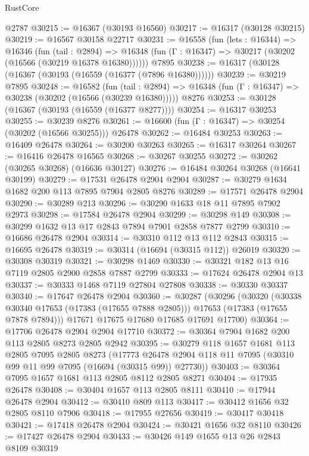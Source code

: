 \begin{lexlean}{RustCore}
\begin{coremodule}
    @2787
@30215 := @16367 (@30193 @16560)
@30217 := @16317 (@30128 @30215)
@30219 := @16567 @30158 @22717
@30231 := @16558
    (fun (lets : @16344) =>
    @16346
      (fun (tail : @2894) =>
      @16348 (fun (Γ : @16347) => @30217 (@30202 (@16566 (@30219 @16378 @16380))))))
    @7895
@30238 := @16317 (@30128 (@16367 (@30193 (@16559 (@16377 (@7896 @16380))))))
@30239 := @30219 @7895
@30248 := @16582
    (fun (tail : @2894) => @16348 (fun (Γ : @16347) => @30238 (@30202 (@16566 (@30239 @16380)))))
    @8276
@30253 := @30128 (@16367 (@30193 (@16559 (@16377 @8277))))
@30254 := @16317 @30253
@30255 := @30239 @8276
@30261 := @16600 (fun (Γ : @16347) => @30254 (@30202 (@16566 @30255))) @26478
@30262 := @16484 @30253
@30263 := @16409 @26478
@30264 := @30200 @30263
@30265 := @16317 @30264
@30267 := @16416 @26478 @16565
@30268 := @30267 @30255
@30272 := @30262 (@30265 @30268) (@16636 @30127)
@30276 := @16484 @30264 @30268 (@16641 @30199)
@30279 := @17531 @26478 @2904 @2904
@30287 := @30279 @1634 @1682 @200 @113 @7895 @7904 @2805 @8276
@30289 := @17571 @26478 @2904
@30290 := @30289 @213
@30296 := @30290 @1633 @18 @11 @7895 @7902 @2973
@30298 := @17584 @26478 @2904
@30299 := @30298 @149
@30308 := @30299 @1632 @13 @17 @2843 @7894 @7901 @2858 @7877 @2799
@30310 := @16686 @26478 @2904
@30314 := @30310 @112 @13 @112 @2843
@30315 := @16695 @26478
@30319 := @30314 (@16694 (@30315 @112)) @26019
@30320 := @30308 @30319
@30321 := @30298 @1469
@30330 := @30321 @182 @13 @16 @7119 @2805 @2900 @2858 @7887 @2799
@30333 := @17624 @26478 @2904 @13
@30337 := @30333 @1468 @7119 @27804 @27808
@30338 := @30330 @30337
@30340 := @17647 @26478 @2904
@30360 := @30287
    (@30296
      (@30320
        (@30338 @30340 @17653 (@17383 (@17655 @7888 @2805)))
        @17653
        (@17383 (@17655 @7878 @7894)))
      @17671
      @17675
      @17680
      @17685
      @17691
      @17700)
@30364 := @17706 @26478 @2904 @2904 @17710
@30372 := @30364 @7904 @1682 @200 @113 @2805 @8273 @2805 @2942
@30395 := @30279
    @118
    @1657
    @1681
    @113
    @2805
    @7095
    @2805
    @8273
    (@17773 @26478 @2904 @118 @11 @7095 (@30310 @99 @11 @99 @7095 (@16694 (@30315 @99)) @27730))
@30403 := @30364 @7095 @1657 @1681 @113 @2805 @8112 @2805 @8271
@30404 := @17935 @26478
@30408 := @30404 @1657 @113 @2805 @8111
@30410 := @17944 @26478 @2904
@30412 := @30410 @809 @113
@30417 := @30412 @1656 @32 @2805 @8110 @7906
@30418 := @17955 @27656
@30419 := @30417 @30418
@30421 := @17418 @26478 @2904
@30424 := @30421 @1656 @32 @8110
@30426 := @17427 @26478 @2904
@30433 := @30426 @149 @1655 @13 @26 @2843 @8109 @30319

\end{coremodule}
\end{lexlean}
